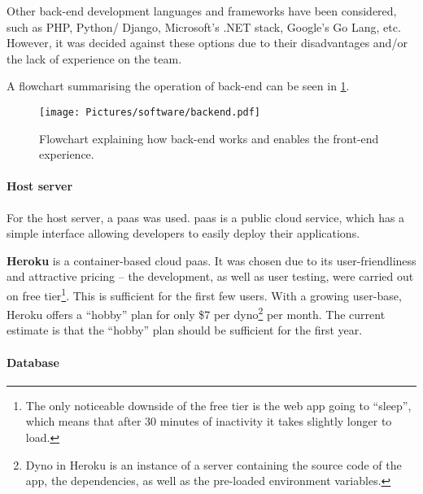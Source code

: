 
Other back-end development languages and frameworks have been considered, such as PHP, Python/ Django, Microsoft's .NET stack, Google's Go Lang, etc. However, it was decided against these options due to their disadvantages and/or the lack of experience on the team. 

A flowchart summarising the operation of back-end can be seen in \cref{fig:backend}.

\begin{figure}
    \centering
    \texttt{[image: Pictures/software/backend.pdf]}
    \captionsetup{justification = centering}
    \caption{Flowchart explaining how back-end works and enables the front-end experience.}
    \label{fig:backend}
\end{figure}

\paragraph{Host server}

For the host server, a \gls{paas} was used. \Gls{paas} is a public cloud service, which has a simple interface allowing developers to easily deploy their applications.

\textbf{Heroku} is a container-based cloud \gls{paas}. It was chosen due to its user-friendliness and attractive pricing -- the development, as well as user testing, were carried out on free tier\footnote{The only noticeable downside of the free tier is the web app going to ``sleep'', which means that after 30 minutes of inactivity it takes slightly longer to load.}. This is sufficient for the first few users. With a growing user-base, Heroku offers a ``hobby'' plan for only \$7 per dyno\footnote{Dyno in Heroku is an instance of a server containing the source code of the app, the dependencies, as well as the pre-loaded environment variables.} per month. The current estimate is that the ``hobby'' plan should be sufficient for the first year.

\paragraph{Database}

    
